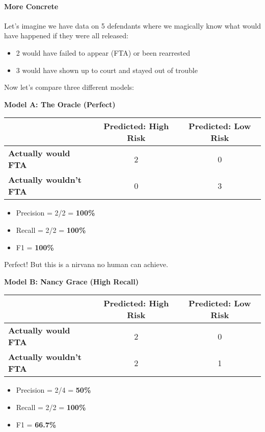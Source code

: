 \paragraph{More Concrete}

Let's imagine we have data on 5 defendants where we magically know what would have happened if they were all released:
\begin{itemize}
\item 2 would have failed to appear (FTA) or been rearrested
\item 3 would have shown up to court and stayed out of trouble
\end{itemize}

Now let's compare three different models:

\textbf{Model A: The Oracle (Perfect)}
\begin{table}[H]
\centering
\begin{tabular}{|l|c|c|}
\hline
& \textbf{Predicted: High Risk} & \textbf{Predicted: Low Risk} \\
\hline
\textbf{Actually would FTA} & 2 & 0 \\
\hline
\textbf{Actually wouldn't FTA} & 0 & 3 \\
\hline
\end{tabular}
\end{table}

\begin{itemize}
\item Precision = 2/2 = \textbf{100\%}
\item Recall = 2/2 = \textbf{100\%}
\item F1 = \textbf{100\%}
\end{itemize}

Perfect! But this is a nirvana no human can achieve.

\textbf{Model B: Nancy Grace (High Recall)}
\begin{table}[H]
\centering
\begin{tabular}{|l|c|c|}
\hline
& \textbf{Predicted: High Risk} & \textbf{Predicted: Low Risk} \\
\hline
\textbf{Actually would FTA} & 2 & 0 \\
\hline
\textbf{Actually wouldn't FTA} & 2 & 1 \\
\hline
\end{tabular}
\end{table}

\begin{itemize}
\item Precision = 2/4 = \textbf{50\%}
\item Recall = 2/2 = \textbf{100\%}
\item F1 = \textbf{66.7\%}
\end{itemize}

